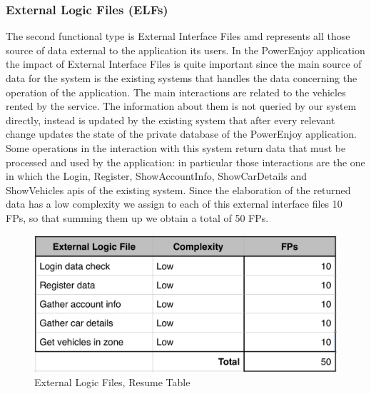 \documentclass[a4paper,10pt]{article}
\begin{document}
\subsubsection{External Logic Files (ELFs)} The second functional type is External Interface Files amd represents all those source of 
data external to the application its users. In the PowerEnjoy application the impact of External Interface Files is quite important
since the main source of data for the system is the existing systems that handles the data concerning the operation of the application.
The main interactions are related to the vehicles rented by the service. The information about them is not queried by our system directly, 
instead is updated by the existing system that after every relevant change updates the state of the private database of the 
PowerEnjoy application. Some operations in the interaction with this system return data that must be processed and used by the application:
in particular those interactions are the one in which the Login, Register, ShowAccountInfo, ShowCarDetails and ShowVehicles apis of the
existing system. Since the elaboration of the returned data has a low complexity we assign to each of this external interface files 10 FPs,
so that summing them up we obtain a total of 50 FPs.
  \begin{figure}[h]
  \centering
    \includegraphics[scale=0.2]{Resources/exlogic.png}
    \caption{External Logic Files, Resume Table}
  \end{figure}
\end{document}
